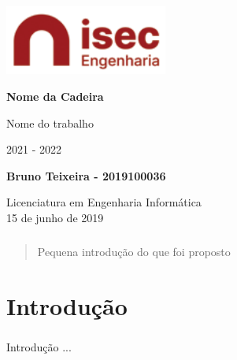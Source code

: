 \documentclass{report}
\def\data{15 de junho de 2019}
\begin{document}
	\begin{titlepage}
    	\begin{center}
    		\includegraphics[width=0.4\textwidth]{isec}
    		
    		\vspace*{\fill}
    		
    		\Huge
    		\textbf{Nome da Cadeira}
    		
    		\huge
    		Nome do trabalho
    		
    		\vspace{0.5cm}
    		\LARGE
    		2021 - 2022
    		
    		\vspace{1.5cm}
    		
    		\textbf{Bruno Teixeira - 2019100036}
    		
    		\vfill
    		\vspace*{\fill}
    		
    		\normalsize
    		Licenciatura em Engenharia Informática \\
                \data
    	\end{center}
      \end{titlepage}


\begin{abstract}
  \paragraph{}Pequena introdução do que foi proposto
\end{abstract}


\tableofcontents
 \listoffigures    %


\clearpage
{}

\chapter{Introdução}
\label{chap.introducao}
\paragraph{}Introdução ...
\end{document}
